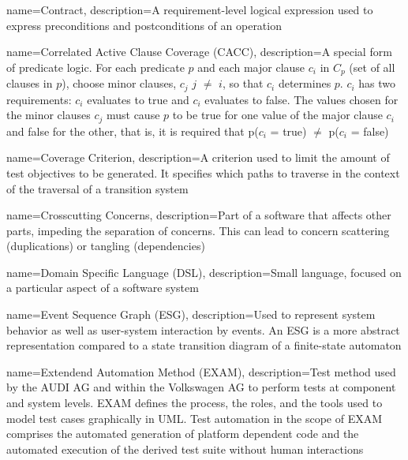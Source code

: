{
	name={Contract},
	description={A requirement-level logical expression used to express preconditions and postconditions of an operation \cite{ClementineNebut2006}}
}

{
	name={Correlated Active Clause Coverage (CACC)},
	description={A special form of predicate logic. For each predicate $p$ and each major clause $c_i$  in $C_p$ (set of all clauses in $p$), choose minor clauses, $c_j$  $j$ $\neq$ $i$, so that $c_i$ determines $p$. $c_i$ has two requirements: $c_i$ evaluates to true and $c_i$ evaluates to false. The values chosen for the minor clauses $c_j$ must cause $p$ to be true for one value of the major clause $c_i$ and false for the other, that is, it is required that p($c_i$ = true) $\neq$ p($c_i$ = false) \cite{Ammann2021}}
}

{
	name={Coverage Criterion},
	description={A criterion used to limit the amount of test objectives to be generated. It specifies which paths to traverse in the context of the traversal of a transition system \cite{ClementineNebut2006}}
}

{
	name={Crosscutting Concerns},
	description={Part of a software that affects other parts, impeding the separation of concerns. This can lead to concern scattering (duplications) or tangling (dependencies) \cite{Metsa}}
}

{
	name={Domain Specific Language (DSL)},
	description={Small language, focused on a particular aspect of a software system \cite{Fowler2010}}
}

{
	name={Event Sequence Graph (ESG)},
	description={Used to represent system behavior as well as user-system interaction by events. An ESG is a more abstract representation compared to a state transition diagram of a finite-state automaton \cite{Belli2009}}
}

{
	name={Extendend Automation Method (EXAM)},
	description={Test method used by the AUDI AG and within the Volkswagen AG to perform tests at component and system levels. EXAM defines the process, the roles, and the tools used to model test cases graphically in UML. Test automation in the scope of EXAM comprises the automated generation of platform dependent code and the automated execution of the derived test suite without human interactions \cite{Siegl2010}}
}

